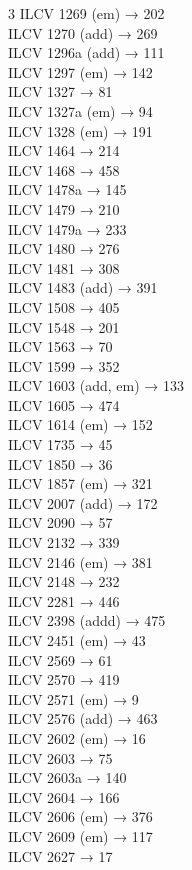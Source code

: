 \begin{multicols}{3}
ILCV 1269 (em) → 202\\
ILCV 1270 (add) → 269\\
ILCV 1296a (add) → 111\\
ILCV 1297 (em) → 142\\
ILCV 1327 → 81\\
ILCV 1327a (em) → 94\\
ILCV 1328 (em) → 191\\
ILCV 1464 → 214\\
ILCV 1468 → 458\\
ILCV 1478a → 145\\
ILCV 1479 → 210\\
ILCV 1479a → 233\\
ILCV 1480 → 276\\
ILCV 1481 → 308\\
ILCV 1483 (add) → 391\\
ILCV 1508 → 405\\
ILCV 1548 → 201\\
ILCV 1563 → 70\\
ILCV 1599 → 352\\
ILCV 1603 (add, em) → 133\\
ILCV 1605 → 474\\
ILCV 1614 (em) → 152\\
ILCV 1735 → 45\\
ILCV 1850 → 36\\
ILCV 1857 (em) → 321\\
ILCV 2007 (add) → 172\\
ILCV 2090 → 57\\
ILCV 2132 → 339\\
ILCV 2146 (em) → 381\\
ILCV 2148 → 232\\
ILCV 2281 → 446\\
ILCV 2398 (addd) → 475\\
ILCV 2451 (em) → 43\\
ILCV 2569 → 61\\
ILCV 2570 → 419\\
ILCV 2571 (em) → 9\\
ILCV 2576 (add) → 463\\
ILCV 2602 (em) → 16\\
ILCV 2603 → 75\\
ILCV 2603a → 140\\
ILCV 2604 → 166\\
ILCV 2606 (em) → 376\\
ILCV 2609 (em) → 117\\
ILCV 2627 → 17\\

\end{multicols}
